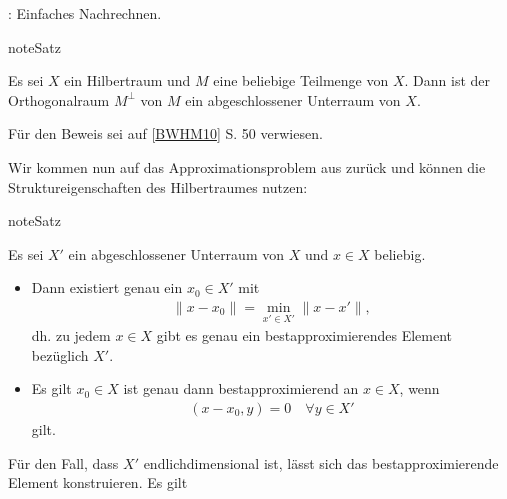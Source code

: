\documentclass[letterpaper,10pt,english]{jupyterBook}
\begin{document}
: Einfaches Nachrechnen.

\begin{sphinxadmonition}{note}{Satz}

Es sei \(X\) ein Hilbertraum und \(M\) eine beliebige Teilmenge von \(X\). Dann ist der Orthogonalraum \(M^\perp\) von \(M\) ein abgeschlossener Unterraum von \(X\).
\end{sphinxadmonition}

Für den Beweis sei auf {[}\hyperlink{cite.Appendix:id2}{BWHM10}{]} S. 50 verwiesen.

Wir kommen nun auf das Approximationsproblem aus {\hyperref[\detokenize{Funktionalanalysis/GrundlegendeRaeume:bestapproximationmetrisch}]{}} zurück und können die Struktureigenschaften des Hilbertraumes nutzen:

\begin{sphinxadmonition}{note}{Satz}

Es sei \(X'\) ein abgeschlossener Unterraum von \(X\) und \(x\in X\) beliebig.
\begin{itemize}
\item {} 
Dann existiert genau ein \(x_0 \in X'\) mit
\begin{equation*}
\begin{split}\|x-x_0\| = \min_{x'\in X'} \|x-x'\|,\end{split}
\end{equation*}
dh. zu jedem \(x\in X\) gibt es genau ein bestapproximierendes Element bezüglich \(X'\).

\item {} 
Es gilt \(x_0\in X\) ist genau dann bestapproximierend an \(x\in X\), wenn
\begin{equation*}
\begin{split}(x-x_0,y) = 0\quad \forall y\in X'\end{split}
\end{equation*}
gilt.

\end{itemize}
\end{sphinxadmonition}

Für den Fall, dass \(X'\) endlich\sphinxhyphen{}dimensional ist, lässt sich das bestapproximierende Element konstruieren. Es gilt
\end{document}

